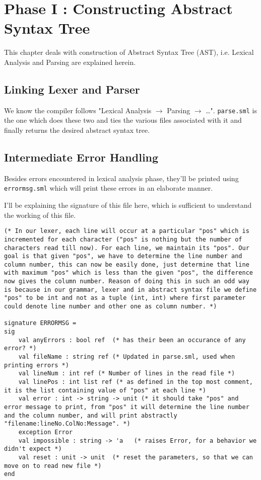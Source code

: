 \chapter{Phase I : Constructing Abstract Syntax Tree}

This chapter deals with construction of Abstract Syntax Tree (AST), i.e. Lexical Analysis and Parsing are explained herein.

\section{Linking Lexer and Parser}


We know the compiler follows "Lexical Analysis $\rightarrow$ Parsing $\rightarrow$ \dots". \texttt{parse.sml} is the one which does these two and ties the various files associated with it and finally returns the desired abstract syntax tree.

\section{Intermediate Error Handling}


Besides errors encountered in lexical analysis phase, they'll be printed using \texttt{errormsg.sml} which will print these errors in an elaborate manner.

I'll be explaining the signature of this file here, which is sufficient to understand the working of this file.

\begin{verbatim}
(* In our lexer, each line will occur at a particular "pos" which is incremented for each character ("pos" is nothing but the number of characters read till now). For each line, we maintain its "pos". Our goal is that given "pos", we have to determine the line number and column number, this can now be easily done, just determine that line with maximum "pos" which is less than the given "pos", the difference now gives the column number. Reason of doing this in such an odd way is because in our grammar, lexer and in abstract syntax file we define "pos" to be int and not as a tuple (int, int) where first parameter could denote line number and other one as column number. *)

signature ERRORMSG =
sig
    val anyErrors : bool ref  (* has their been an occurance of any error? *)
    val fileName : string ref (* Updated in parse.sml, used when printing errors *)
    val lineNum : int ref (* Number of lines in the read file *)
    val linePos : int list ref (* as defined in the top most comment, it is the list containing value of "pos" at each line *)
    val error : int -> string -> unit (* it should take "pos" and error message to print, from "pos" it will determine the line number and the column number, and will print abstractly "filename:lineNo.ColNo:Message". *)
    exception Error
    val impossible : string -> 'a   (* raises Error, for a behavior we didn't expect *)
    val reset : unit -> unit  (* reset the parameters, so that we can move on to read new file *)
end
\end{verbatim}

